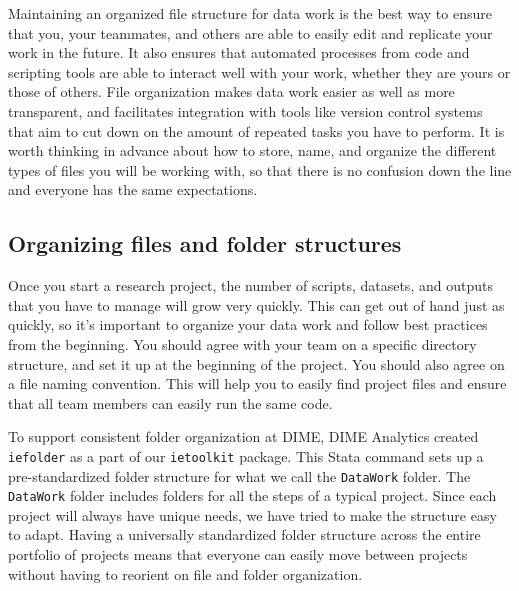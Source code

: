 Maintaining an organized file structure for data work is the best way
to ensure that you, your teammates, and others
are able to easily edit and replicate your work in the future.
It also ensures that automated processes from code and scripting tools
are able to interact well with your work,
whether they are yours or those of others.
File organization makes data work easier as well as more transparent,
and facilitates integration with tools like version control systems
that aim to cut down on the amount of repeated tasks you have to perform.
It is worth thinking in advance about how to store, name, and organize
the different types of files you will be working with,
so that there is no confusion down the line
and everyone has the same expectations.

\subsection{Organizing files and folder structures}

Once you start a research project,
the number of scripts, datasets, and outputs 
that you have to manage will grow very quickly.
This can get out of hand just as quickly,
so it's important to organize your data work 
and follow best practices from the beginning.
You should agree with your team on a specific directory structure,
and set it up at the beginning of the project.
You should also agree on a file naming convention.
This will help you to easily find project files and
ensure that all team members can easily run the same code.

To support consistent folder organization at DIME,
DIME Analytics created \texttt{iefolder}
as a part of our \texttt{ietoolkit} package.
This Stata command sets up a pre-standardized folder structure
for what we call the \texttt{DataWork} folder.
The \texttt{DataWork} folder includes folders for all the steps of a typical project.
Since each project will always have unique needs,
we have tried to make the structure easy to adapt.
Having a universally standardized folder structure
across the entire portfolio of projects
means that everyone can easily move between projects
without having to reorient on file and folder organization.

